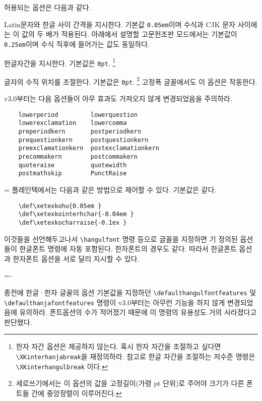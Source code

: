\documentclass[a4paper]{article}
\def\grayvrule{{\color{white!80!black}\vrule width 2pt}}
\newenvironment{plaintex}
  {\par\medskip
    \setbox0=\vbox\bgroup\kern5pt\leftskip15pt \small
    \parindent0pt }
  {\par \kern5pt\egroup
    \dimen0=\dimexpr\pagegoal-\pagetotal\relax
    \ifdim\dimen0<\baselineskip\relax \dimen0\maxdimen \fi
    \ifdim\ht0<\dimen0
      \hbox{\grayvrule \box0}%
    \else
      \setbox2=\vsplit0 to\dimen0
      \lineskip0pt
      \ifvoid2 \else\hbox{\grayvrule \box2}\fi
      \ifvoid0 \else\hbox{\grayvrule \box0}\fi
    \fi \par\smallskip
  }
\def\cs#1{\texttt{\textbackslash #1}}
\begin{document}
허용되는 옵션은 다음과 같다.
\begin{description}\itemsep0pt
\item[InterLatinCJK, hu]\quad
  { Latin문자와} 한글 사이 간격을 지시한다.
    기본값 \verb|0.05em|이며
    수식과 CJK 문자 사이에는 이 값의 두 배가 적용된다.
    아래에서 설명할 고문헌조판 모드에서는 기본값이 \verb|0.25em|이며
    수식 직후에 들어가는 값도 동일하다.

\item[InterHangul, interhchar]\quad
  { 한글자간을} 지시한다.
  기본값은 \verb|0pt|.%
  \footnote{한자 자간 옵션은 제공하지 않는다.
  혹시 한자 자간을 조절하고 싶다면 \cs{XKinterhanjabreak}을 재정의하라.
  참고로 한글 자간을 조절하는 저수준 명령은 \cs{XKinterhangulbreak} 이다.}

\item[CharRaise, charraise]\quad
  글자의 {수직 위치}를 조절한다.
  기본값은 \verb|0pt|.%
    \footnote{%
      세로쓰기에서는 이 옵션의 값을 고정길이(가령 pt 단위)로 주어야
      크기가 다른 폰트들 간에 중앙정렬이 이루어진다.
    }
  고정폭 글꼴에서도 이 옵션은 작동한다.
\end{description}
v3.0부터는 다음 옵션들이 아무 효과도 가져오지 않게
변경되었음을 주의하라.
\begin{verbatim}
    lowerperiod         lowerquestion
    lowerexclamation    lowercomma
    preperiodkern       postperiodkern
    prequestionkern     postquestionkern
    preexclamationkern  postexclamationkern
    precommakern        postcommakern
    quoteraise          quotewidth
    postmathskip        PunctRaise
\end{verbatim}

\begin{plaintex}
  플레인텍에서는 다음과 같은 방법으로 제어할 수 있다. 기본값은  같다.
\begin{verbatim}
    \def\xetexkohu{0.05em }
    \def\xetexkointerhchar{-0.04em }
    \def\xetexkocharraise{-0.1ex }
\end{verbatim}
  이것들을 선언해두고나서 \cs{hangulfont} 명령 등으로 글꼴을
  지정하면 기 정의된 옵션들이 한글폰트 명령에 자동 포함된다.
  한자폰트의 경우도 같다. 따라서 한글폰트 옵션과
  한자폰트 옵션을 서로 달리 지시할 수 있다.
\end{plaintex}

종전에 한글·한자 글꼴의 옵션 기본값을 지정하던
\cs{defaulthangulfontfeatures} 및 \cs{defaulthanjafontfeatures} 명령이
v3.0부터는
아무런 기능을 하지 않게 변경되었음에 유의하라.
폰트옵션의 수가 적어졌기 때문에 이 명령의 유용성도 거의 사라졌다고 판단했다.
\end{document}
